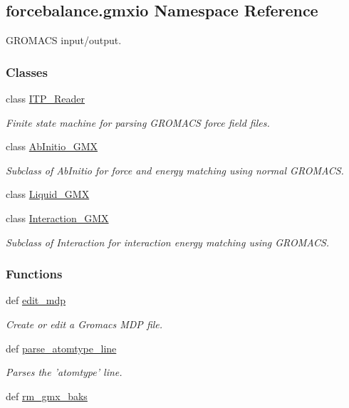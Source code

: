 \hypertarget{namespaceforcebalance_1_1gmxio}{\subsection{forcebalance.\-gmxio Namespace Reference}
\label{namespaceforcebalance_1_1gmxio}
}


G\-R\-O\-M\-A\-C\-S input/output.  


\subsubsection*{Classes}
\begin{DoxyCompactItemize}
\item 
class \hyperlink{classforcebalance_1_1gmxio_1_1ITP__Reader}{I\-T\-P\-\_\-\-Reader}
\begin{DoxyCompactList}\small\item\em Finite state machine for parsing G\-R\-O\-M\-A\-C\-S force field files. \end{DoxyCompactList}\item 
class \hyperlink{classforcebalance_1_1gmxio_1_1AbInitio__GMX}{Ab\-Initio\-\_\-\-G\-M\-X}
\begin{DoxyCompactList}\small\item\em Subclass of Ab\-Initio for force and energy matching using normal G\-R\-O\-M\-A\-C\-S. \end{DoxyCompactList}\item 
class \hyperlink{classforcebalance_1_1gmxio_1_1Liquid__GMX}{Liquid\-\_\-\-G\-M\-X}
\item 
class \hyperlink{classforcebalance_1_1gmxio_1_1Interaction__GMX}{Interaction\-\_\-\-G\-M\-X}
\begin{DoxyCompactList}\small\item\em Subclass of Interaction for interaction energy matching using G\-R\-O\-M\-A\-C\-S. \end{DoxyCompactList}\end{DoxyCompactItemize}
\subsubsection*{Functions}
\begin{DoxyCompactItemize}
\item 
def \hyperlink{namespaceforcebalance_1_1gmxio_acc5bef2c5c991cd70a948a1dd43ef6a6}{edit\-\_\-mdp}
\begin{DoxyCompactList}\small\item\em Create or edit a Gromacs M\-D\-P file. \end{DoxyCompactList}\item 
def \hyperlink{namespaceforcebalance_1_1gmxio_a29af6ace00d7e58258e0a854ca13d954}{parse\-\_\-atomtype\-\_\-line}
\begin{DoxyCompactList}\small\item\em Parses the 'atomtype' line. \end{DoxyCompactList}\item 
def \hyperlink{namespaceforcebalance_1_1gmxio_acac8488f29b62fb0d4cb54bb5a041026}{rm\-\_\-gmx\-\_\-baks}
\end{DoxyCompactItemize}
